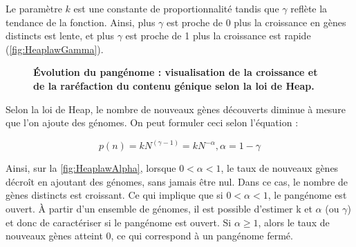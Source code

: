 Le paramètre $k$ est une constante de proportionnalité tandis que $\gamma$ reflète la tendance de la fonction. Ainsi, plus $\gamma$ est proche de 0 plus la croissance en gènes distincts est lente, et plus $\gamma$ est proche de 1 plus la croissance est rapide (\autoref{fig:HeaplawGamma}).

\begin{figure}[htbp]
    \centering
    \hfill
    \caption[Évolution du pangénome : visualisation de la croissance et de la raréfaction du contenu génique selon la loi de Heap]{\textbf{Évolution du pangénome : visualisation de la croissance et de la raréfaction du contenu génique selon la loi de Heap.}}
    \label{fig:Heaplaw}
\end{figure}

Selon la loi de Heap, le nombre de nouveaux gènes découverts diminue à mesure que l'on ajoute des génomes. On peut formuler ceci selon l'équation : 

\begin{equation}
    p(n)=kN^{(\gamma-1)}=kN^{-\alpha}, \alpha=1-\gamma
\end{equation}

Ainsi, sur la \autoref{fig:HeaplawAlpha}, lorsque $0<\alpha<1$, le taux de nouveaux gènes décroît en ajoutant des génomes, sans jamais être nul. Dans ce cas, le nombre de gènes distincts est croissant. Ce qui implique que si $0<\alpha<1$, le pangénome est ouvert. À partir d'un ensemble de génomes, il est possible d'estimer k et $\alpha$ (ou $\gamma$) et donc de caractériser si le pangénome est ouvert. Si $\alpha\geq1$, alors le taux de nouveaux gènes atteint 0, ce qui correspond à un pangénome fermé. 


